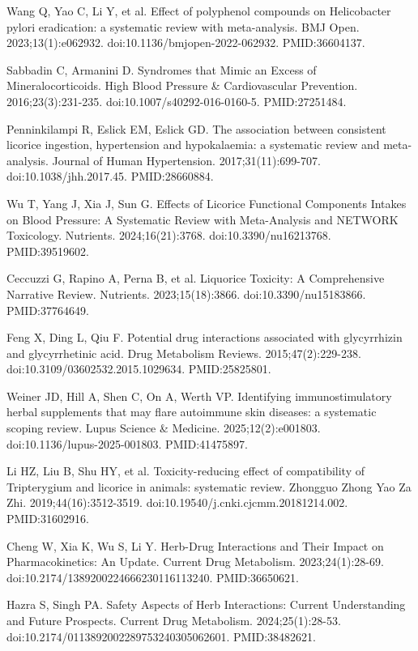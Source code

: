 \documentclass[12pt,oneside]{book}
\newcommand{\reff}[2]{\par\hangindent=7mm\hangafter=1\noindent[#1]\hspace{2mm}#2\par}
\begin{document}
\reff{36}{Wang Q, Yao C, Li Y, et al. Effect of polyphenol compounds on Helicobacter pylori eradication: a systematic review with meta-analysis. BMJ Open. 2023;13(1):e062932. doi:10.1136/bmjopen-2022-062932. PMID:36604137.}

\reff{37}{Sabbadin C, Armanini D. Syndromes that Mimic an Excess of Mineralocorticoids. High Blood Pressure \& Cardiovascular Prevention. 2016;23(3):231-235. doi:10.1007/s40292-016-0160-5. PMID:27251484.}

\reff{38}{Penninkilampi R, Eslick EM, Eslick GD. The association between consistent licorice ingestion, hypertension and hypokalaemia: a systematic review and meta-analysis. Journal of Human Hypertension. 2017;31(11):699-707. doi:10.1038/jhh.2017.45. PMID:28660884.}

\reff{39}{Wu T, Yang J, Xia J, Sun G. Effects of Licorice Functional Components Intakes on Blood Pressure: A Systematic Review with Meta-Analysis and NETWORK Toxicology. Nutrients. 2024;16(21):3768. doi:10.3390/nu16213768. PMID:39519602.}

\reff{40}{Ceccuzzi G, Rapino A, Perna B, et al. Liquorice Toxicity: A Comprehensive Narrative Review. Nutrients. 2023;15(18):3866. doi:10.3390/nu15183866. PMID:37764649.}

\reff{41}{Feng X, Ding L, Qiu F. Potential drug interactions associated with glycyrrhizin and glycyrrhetinic acid. Drug Metabolism Reviews. 2015;47(2):229-238. doi:10.3109/03602532.2015.1029634. PMID:25825801.}

\reff{42}{Weiner JD, Hill A, Shen C, On A, Werth VP. Identifying immunostimulatory herbal supplements that may flare autoimmune skin diseases: a systematic scoping review. Lupus Science \& Medicine. 2025;12(2):e001803. doi:10.1136/lupus-2025-001803. PMID:41475897.}

\reff{43}{Li HZ, Liu B, Shu HY, et al. Toxicity-reducing effect of compatibility of Tripterygium and licorice in animals: systematic review. Zhongguo Zhong Yao Za Zhi. 2019;44(16):3512-3519. doi:10.19540/j.cnki.cjcmm.20181214.002. PMID:31602916.}

\reff{44}{Cheng W, Xia K, Wu S, Li Y. Herb-Drug Interactions and Their Impact on Pharmacokinetics: An Update. Current Drug Metabolism. 2023;24(1):28-69. doi:10.2174/1389200224666230116113240. PMID:36650621.}

\reff{45}{Hazra S, Singh PA. Safety Aspects of Herb Interactions: Current Understanding and Future Prospects. Current Drug Metabolism. 2024;25(1):28-53. doi:10.2174/0113892002289753240305062601. PMID:38482621.}
\end{document}
